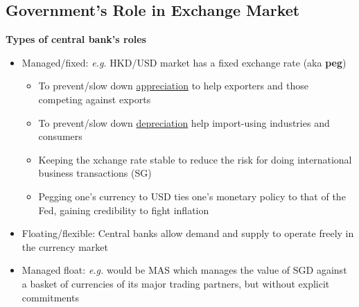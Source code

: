 \documentclass{article}
\newcommand{\eg}[0]{\textit{e.g. }}
\begin{document}
\begin{multicols}{2}
\subsection{Government's Role in Exchange Market}
\textbf{Types of central bank's roles}
\begin{itemize}
	\item Managed/fixed: \eg HKD/USD market has a fixed exchange rate (aka \textbf{peg})
	\begin{itemize}
		\item To prevent/slow down \underline{appreciation} to help exporters and those competing against exports
		\item To prevent/slow down \underline{depreciation} help import-using industries and consumers
		\item Keeping the xchange rate stable to reduce the risk for doing international business transactions (SG)
		\item Pegging one's currency to USD ties one's monetary policy to that of the Fed, gaining credibility to fight inflation
	\end{itemize}
	\item Floating/flexible: Central banks allow demand and supply to operate freely in the currency market
	\item Managed float: \eg would be MAS which manages the value of SGD against a basket of currencies of its major trading partners, but without explicit commitments
\end{itemize}

\end{multicols}
\end{document}
